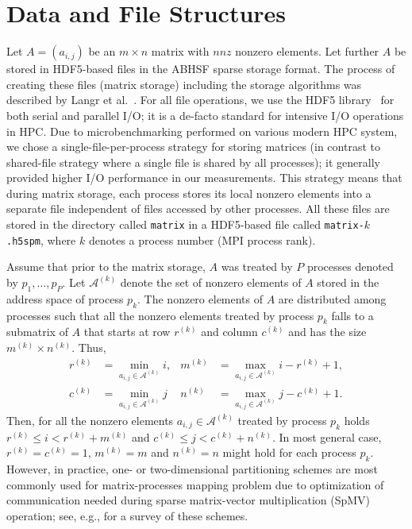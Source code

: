 \documentclass[10pt,a4paper]{article}
\providecommand{\nnz}{\ensuremath{\mathit{nnz}}\xspace}
\begin{document}
\section{Data and File Structures}

Let $A=(a_{i,j})$ be an $m\times n$ matrix with \nnz nonzero elements. Let further $A$ be stored in HDF5-based files in the ABHSF sparse storage format. The process of creating these files (matrix storage) including the storage algorithms was described by Langr et al.~\cite{Langr:2013a}. For all file operations, we use the HDF5 library~\cite{HDFGroup:2013} for both serial and parallel I/O; it is a de-facto standard for intensive I/O operations in HPC. Due to microbenchmarking performed on various modern HPC system, we chose a single-file-per-process strategy for storing matrices (in contrast to shared-file strategy where a single file is shared by all processes); it generally provided higher I/O performance in our measurements. This strategy means that during matrix storage, each process stores its local nonzero elements into a separate file independent of files accessed by other processes. All these files are stored in the directory called \texttt{matrix} in a HDF5-based file called \texttt{matrix-}$k$\texttt{.h5spm}, where $k$ denotes a process number (MPI process rank).

Assume that prior to the matrix storage, $A$ was treated by $P$ processes denoted by $p_1,\ldots,p_P$. Let $\mathcal{A}^{(k)}$ denote the set of nonzero elements of $A$ stored in the address space of process $p_k$. The nonzero elements of $A$ are distributed among processes such that all the nonzero elements treated by process $p_k$ falls to a submatrix of $A$ that starts at row $r^{(k)}$ and column $c^{(k)}$ and has the size $m^{(k)}\times n^{(k)}$. Thus,
\begin{align}
r^{(k)} &= \min_{a_{i,j}\in \mathcal{A}^{(k)}} i, &
m^{(k)} &= \max_{a_{i,j}\in \mathcal{A}^{(k)}} i - r^{(k)} + 1, \\
c^{(k)} &= \min_{a_{i,j}\in \mathcal{A}^{(k)}} j &
n^{(k)} &= \max_{a_{i,j}\in \mathcal{A}^{(k)}} j - c^{(k)} + 1.
\end{align}
Then, for all the nonzero elements $a_{i,j}\in \mathcal{A}^{(k)}$ treated by process $p_k$ holds $r^{(k)} \leq i < r^{(k)}+m^{(k)}$ and $c^{(k)} \leq j < c^{(k)}+n^{(k)}$. In most general case, $r^{(k)}=c^{(k)}=1$, $m^{(k)}=m$ and $n^{(k)}=n$ might hold for each process $p_k$. However, in practice, one- or two-dimensional partitioning schemes are most commonly used for matrix-processes mapping problem due to optimization of communication needed during sparse matrix-vector multiplication (SpMV) operation; see, e.g., \cite{Catalyurek:2010} for a survey of these schemes.
\end{document}
